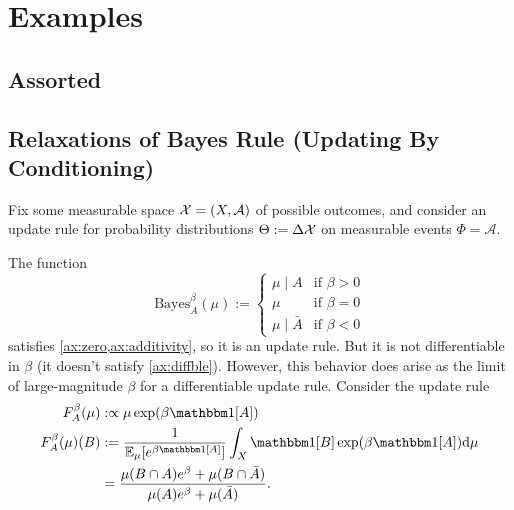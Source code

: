 \documentclass{article}
\begin{document}


\section{Examples}
\subsection{Assorted}

\subsection{Relaxations of Bayes Rule (Updating By Conditioning)}
Fix some measurable space $\mathcal X = (X, \mathcal A)$ of possible outcomes, and consider an update rule for probability distributions $\Theta := \Delta\mathcal X$
on measurable events $\Phi = \mathcal A$.

The function
\[
    \mathrm{Bayes}^\beta_A(\mu) := \begin{cases}
            \mu \mid A &  \text{if }\beta > 0 \\
            \mu & \text{if } \beta = 0 \\
            \mu \mid \bar A &  \text{if } \beta < 0
        \end{cases}
\]
satisfies \cref{ax:zero,ax:additivity}, so it is an update rule.  But it is not differentiable in $\beta$ (it doesn't satisfy \cref{ax:diffble}).
However, this behavior does arise as the limit of large-magnitude $\beta$ for a differentiable update rule. Consider the update rule
\begin{align*}
    F^\beta_A (\mu) &:\propto \mu \exp(\beta \mathbbm1[A]) \\
    F^\beta_A (\mu)(B) &:=
        \frac{1}{\Ex_{\mu}[e^{\beta\mathbbm1[A]}]}\int_{X}  \mathbbm1[B] \exp(\beta \mathbbm1[A]) \mathrm d\mu \\
        &=
        \frac{\mu(B\cap A)e^{\beta} + \mu(B \cap \bar A) }
        {\mu(A)e^{\beta} + \mu(\bar A)}.
\end{align*}
\end{document}
